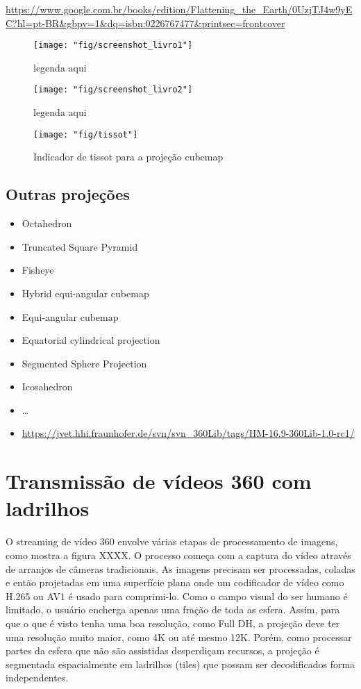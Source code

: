 \url{https://www.google.com.br/books/edition/Flattening_the_Earth/0UzjTJ4w9yEC?hl=pt-BR&gbpv=1&dq=isbn:0226767477&printsec=frontcover}

\begin{figure}[tbh]
	\centering
	\texttt{[image: "fig/screenshot\_livro1"]}
	\caption{legenda aqui}
	\label{fig:screenshot_livro1}
\end{figure}

\begin{figure}[tbh]
	\centering
	\texttt{[image: "fig/screenshot\_livro2"]}
	\caption{legenda aqui}
	\label{fig:screenshot_livro2}
\end{figure}

\begin{figure}[tbh]
	\centering
	\texttt{[image: "fig/tissot"]}
	\caption{Indicador de tissot para a projeção cubemap}
	\label{fig:tissot}
\end{figure}

\subsection{Outras projeções}

\begin{itemize}
	\item Octahedron
	\item Truncated Square Pyramid
	\item Fisheye
	\item Hybrid equi-angular cubemap
	\item Equi-angular cubemap
	\item Equatorial cylindrical projection
	\item Segmented Sphere Projection
	\item Icosahedron
	\item …
	\item \url{https://jvet.hhi.fraunhofer.de/svn/svn_360Lib/tags/HM-16.9-360Lib-1.0-rc1/}
\end{itemize}

\section{Transmissão de vídeos 360 com ladrilhos}

O streaming de vídeo 360 envolve várias etapas de processamento de imagens, como mostra a figura XXXX. O processo começa com a captura do vídeo através de arranjos de câmeras tradicionais. As imagens precisam ser processadas, coladas e então projetadas em uma superfície plana onde um codificador de vídeo como H.265 ou AV1 é usado para comprimi-lo. Como o campo visual do ser humano é limitado, o usuário encherga apenas uma fração de toda as esfera. Assim, para que o que é visto tenha uma boa resolução, como Full DH, a projeção deve ter uma resolução muito maior, como 4K ou até mesmo 12K. Porém, como processar partes da esfera que não são assistidas desperdiçam recursos, a projeção é segmentada espacialmente em ladrilhos (tiles) que possam ser decodificados forma independentes.

